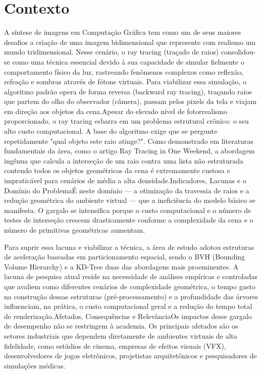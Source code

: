 \documentclass[
    12pt,                %
    openright,           %
    oneside,             %
    a4paper,             %
    english,             %
    brazil               %
]{abntex2}
\begin{document}
\section{Contexto}
\label{sec:contexto}
A síntese de imagens em Computação Gráfica tem como um de seus maiores desafios a criação de uma imagem bidimensional que represente com realismo um mundo tridimensional. Nesse cenário, o ray tracing (traçado de raios) consolidou-se como uma técnica essencial
devido à sua capacidade de simular fielmente o comportamento físico da luz, rastreando fenômenos complexos como reflexão, refração e sombras através de fótons virtuais. Para viabilizar essa simulação, o algoritmo padrão opera de forma reversa (backward ray tracing), traçando raios que partem do olho do observador (câmera), passam pelos pixels da tela e viajam em direção aos objetos da cena.Apesar do elevado nível de fotorrealismo proporcionado, o ray tracing esbarra em um problema estrutural crônico: o seu alto custo computacional. A base do algoritmo exige que se pergunte repetidamente "qual objeto este raio atinge?". 
Como demonstrado em literaturas fundamentais da área, como o artigo Ray Tracing in One Weekend, a abordagem ingênua que calcula a interseção de um raio contra uma lista não estruturada contendo todos os objetos geométricos da cena é extremamente custosa e impraticável para cenários de média a alta densidade.Indicadores, Lacunas e o Domínio do ProblemaÉ neste domínio — a otimização da travessia de raios e a redução geométrica do ambiente virtual — que a ineficiência do modelo básico se manifesta. O gargalo se intensifica porque o custo computacional e o número de testes de interseção crescem drasticamente conforme a complexidade da cena e o número de primitivas geométricas aumentam.


Para suprir essa lacuna e viabilizar a técnica, a área de estudo adotou estruturas de aceleração baseadas em particionamento espacial, sendo o BVH (Bounding Volume Hierarchy) e a KD-Tree duas das abordagens mais proeminentes. A lacuna de pesquisa atual reside na necessidade de análises empíricas e controladas que avaliem como diferentes cenários de complexidade geométrica, o tempo gasto na construção dessas estruturas (pré-processamento) e a profundidade das árvores influenciam, na prática, o custo computacional geral e a redução do tempo total de renderização.Afetados, Consequências e RelevânciaOs impactos desse gargalo de desempenho não se restringem à academia. Os principais afetados são os setores industriais que dependem diretamente de ambientes virtuais de alta fidelidade, como estúdios de cinema, empresas de efeitos visuais (VFX), desenvolvedores de jogos eletrônicos, projetistas arquitetônicos e pesquisadores de simulações médicas.
\end{document}
